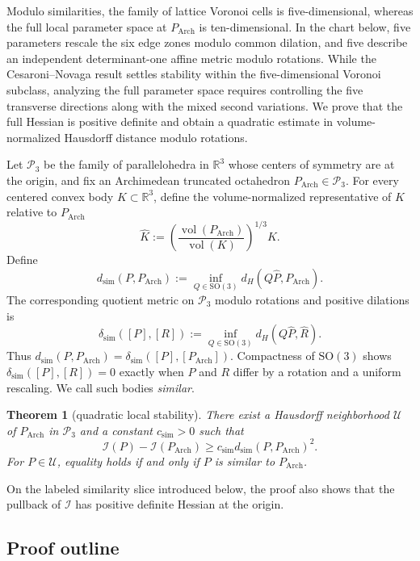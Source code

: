 \documentclass[11pt]{article}
\newcommand{\R}{\mathbb R}
\newcommand{\vol}{\operatorname{vol}}
\newcommand{\Arch}{P_{\mathrm{Arch}}}
\newcommand{\Ical}{\mathcal I}
\newtheorem{theorem}{Theorem}
\theoremstyle{remark}
\begin{document}
Modulo similarities, the family of lattice Voronoi cells is five-dimensional, whereas the full local parameter space at $\Arch$ is ten-dimensional.  In the chart below, five parameters rescale the six edge zones modulo common dilation, and five describe an independent determinant-one affine metric modulo rotations.  
While the Cesaroni--Novaga result settles stability within the five-dimensional Voronoi subclass, analyzing the full parameter space requires controlling the five transverse directions along with the mixed second variations.  We prove that the full Hessian is positive definite and obtain a quadratic estimate in volume-normalized Hausdorff distance modulo rotations.

Let $\mathcal P_3$ be the family of parallelohedra in $\R^3$ whose centers of symmetry are at the origin, and fix an Archimedean truncated octahedron $\Arch\in\mathcal P_3$.  For every centered convex body $K\subset\R^3$, define the volume-normalized representative of $K$ relative to $\Arch$
\[
 \widehat K:=\left(\frac{\vol(\Arch)}{\vol(K)}\right)^{1/3}K.
\]
Define
\begin{equation}\label{eq:distance}
 d_{\mathrm{sim}}(P,\Arch):= \inf_{Q\in\mathrm{SO}(3)}d_H(Q\widehat P,\Arch).
\end{equation}
The corresponding quotient metric on $\mathcal P_3$ modulo rotations and positive dilations is
\[
 \delta_{\mathrm{sim}}([P],[R]):=
 \inf_{Q\in\mathrm{SO}(3)}d_H(Q\widehat P,\widehat R).
\]
Thus $d_{\mathrm{sim}}(P,\Arch)=\delta_{\mathrm{sim}}([P],[\Arch])$.
Compactness of $\mathrm{SO}(3)$ shows $\delta_{\mathrm{sim}}([P],[R])=0$ exactly when $P$ and $R$ differ by a rotation and a uniform rescaling.  We call such bodies \emph{similar}.
\begin{theorem}[quadratic local stability]\label{thm:main}
There exist a Hausdorff neighborhood $\mathcal U$ of $\Arch$ in $\mathcal P_3$ and a constant $c_{\mathrm{sim}}>0$ such that
\begin{equation}\label{eq:intrinsic-stability}
 \Ical(P)-\Ical(\Arch)\geq
 c_{\mathrm{sim}}d_{\mathrm{sim}}(P,\Arch)^2.
\end{equation}
For $P\in\mathcal U$, equality holds if and only if $P$ is similar to $\Arch$. 
\end{theorem}
On the labeled similarity slice introduced below, the proof also shows that the pullback of $\Ical$ has positive definite Hessian at the origin.

\subsection{Proof outline}
\end{document}

